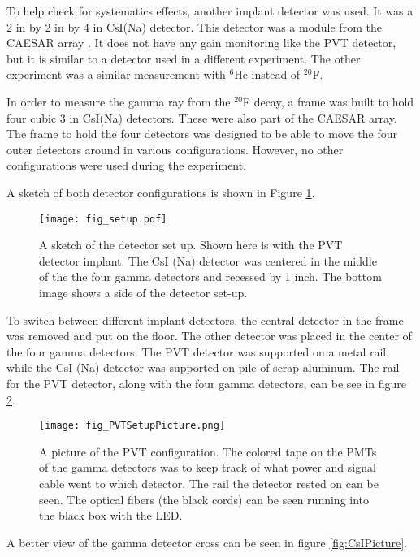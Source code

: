 \documentclass[main.tex]{subfiles}
\begin{document}
To help check for systematics effects, another implant detector was used.
It was a 2 in by 2 in by 4 in  CsI(Na) detector. 
This detector was a module from the CAESAR array \cite{Wei10}.
It does not have any gain monitoring like the PVT detector, but it is similar to a detector used in a different experiment. 
The other experiment was a similar measurement with $^{6}$He instead of $^{20}$F.

In order to measure the gamma ray from the $^{20}$F decay, a frame was built to hold four cubic 3 in CsI(Na) detectors.  
These were also part of the CAESAR array.
The frame to hold the four detectors was designed to be able to move the four outer detectors around in various configurations.
However, no other configurations were used during the experiment. 

A sketch of both detector configurations is shown in Figure \ref{fig:detsketch}.

\begin{figure}
	\centerline{\texttt{[image: fig\_setup.pdf]}}
	\caption{A sketch of the detector set up. 
	Shown here is with the PVT detector implant.
	The CsI (Na) detector was centered in the middle of the the four gamma detectors and recessed by 1 inch.
	The bottom image shows a side of the detector set-up.}
	\label{fig:detsketch}
\end{figure}

To switch between different implant detectors, the central detector in the frame was removed and put on the floor.
The other detector was placed in the center of the four gamma detectors.
The PVT detector was supported on a metal rail, while the CsI (Na) detector was supported on pile of scrap aluminum.
The rail for the PVT detector, along with the four gamma detectors,  can be see in figure \ref{fig:PVTPicture}.

\begin{figure}
	\centerline{\texttt{[image: fig\_PVTSetupPicture.png]}}
	\caption{A picture of the PVT configuration. 
		 The colored tape on the PMTs of the gamma detectors was to keep track of what power and signal cable went to which detector.
		 The rail the detector rested on can be seen.
		 The optical fibers (the black cords) can be seen running into the black box with the LED.
		 }
	\label{fig:PVTPicture}
\end{figure}

A better view of the gamma detector cross can be seen in figure \ref{fig:CsIPicture}.
\end{document}
